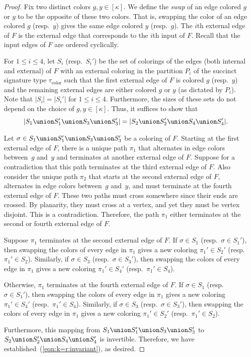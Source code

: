 \documentclass[11pt]{article}
\begin{document}
\begin{proof}
 Fix two distinct colors $g,y \in [\kappa]$.
 We define the \emph{swap} of an edge colored $g$ or $y$ to be the opposite of these two colors.
 That is, swapping the color of an edge colored $g$ (resp.~$y$) gives the same edge colored $y$ (resp.~$g$).
 The $i$th external edge of $F$ is the external edge that corresponds to the $i$th input of $F$.
 Recall that the input edges of $F$ are ordered cyclically.
 
 For $1 \le i \le 4$,
 let $S_i$ (resp.~$S_i'$) be the set of colorings of the edges (both internal and external)
 of $F$ with an external coloring in the partition $P_i$ of the succinct signature type $\tau_\text{color}$
 such that the first external edge of $F$ is colored $g$ (resp.~$y$) and the remaining external edges are either colored $g$ or $y$ (as dictated by $P_i$).
 Note that $|S_i| = |S_i'|$ for $1 \le i \le 4$.
 Furthermore, the sizes of these sets do not depend on the choice of $g,y \in [\kappa].$
 Thus, it suffices to show that
 \begin{equation} \label{eqn:k=r:invariant}
  |S_1 \union S_1' \union S_3 \union S_3'|
  =
  |S_2 \union S_2' \union S_4 \union S_4'|.
 \end{equation}
 
 Let $\sigma \in S_1 \union S_1' \union S_3 \union S_3'$ be a coloring of $F$.
 Starting at the first external edge of $F$,
 there is a unique path $\pi_1$ that alternates in edge colors between~$g$ and~$y$ and terminates at another external edge of $F$.
 Suppose for a contradiction that this path terminates at the third external edge of $F$.
 Also consider the unique path $\pi_2$ that starts at the second external edge of $F$,
 alternates in edge colors between~$g$ and~$y$,
 and must terminate at the fourth external edge of $F$.
 These two paths must cross somewhere since their ends are crossed.
 By planarity, they must cross at a vertex, and yet they must be vertex disjoint.
 This is a contradiction.
 Therefore, the path $\pi_1$ either terminates at the second or fourth external edge of $F$.

 Suppose $\pi_1$ terminates at the second external edge of $F$.
 If $\sigma \in S_1$ (resp.~$\sigma \in S_1'$),
 then swapping the colors of every edge in $\pi_1$ gives a new coloring $\pi_1' \in S_2'$ (resp.~$\pi_1' \in S_2$).
 Similarly,
 if $\sigma \in S_3$ (resp.~$\sigma \in S_3'$),
 then swapping the colors of every edge in $\pi_1$ gives a new coloring $\pi_1' \in S_4'$ (resp.~$\pi_1' \in S_4$).
 
 Otherwise, $\pi_1$ terminates at the fourth external edge of $F$.
 If $\sigma \in S_1$ (resp.~$\sigma \in S_1'$),
 then swapping the colors of every edge in $\pi_1$ gives a new coloring $\pi_1' \in S_4'$ (resp.~$\pi_1' \in S_4$).
 Similarly,
 if $\sigma \in S_3$ (resp.~$\sigma \in S_3'$),
 then swapping the colors of every edge in $\pi_1$ gives a new coloring $\pi_1' \in S_2'$ (resp.~$\pi_1' \in S_2$).
 
 Furthermore, this mapping from $S_1 \union S_1' \union S_3 \union S_3'$ to $S_2 \union S_2' \union S_4 \union S_4'$ is invertible.
 Therefore, we have established~(\ref{eqn:k=r:invariant}), as desired.
\end{proof}
\end{document}
